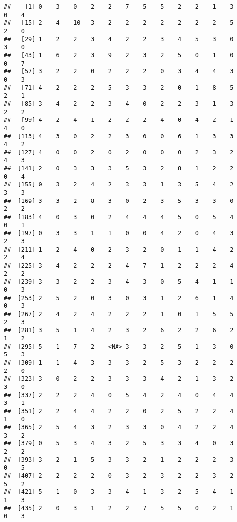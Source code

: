 \documentclass[
]{article}
\begin{document}
\begin{verbatim}
##    [1] 0    3    0    2    2    7    5    5    2    2    1    3    0    4   
##   [15] 2    4    10   3    2    2    2    2    2    2    2    5    2    0   
##   [29] 1    2    2    3    4    2    2    3    4    5    3    0    3    0   
##   [43] 1    6    2    3    9    2    3    2    5    0    1    0    0    7   
##   [57] 3    2    2    0    2    2    2    0    3    4    4    3    0    3   
##   [71] 4    2    2    2    5    3    3    2    0    1    8    5    2    1   
##   [85] 3    4    2    2    3    4    0    2    2    3    1    3    2    2   
##   [99] 4    2    4    1    2    2    2    4    0    4    2    1    4    0   
##  [113] 4    3    0    2    2    3    0    0    6    1    3    3    4    2   
##  [127] 4    0    0    2    0    2    0    0    0    2    3    2    4    3   
##  [141] 2    0    3    3    3    5    3    2    8    1    2    2    0    4   
##  [155] 0    3    2    4    2    3    3    1    3    5    4    2    3    3   
##  [169] 3    3    2    8    3    0    2    3    5    3    3    0    2    2   
##  [183] 4    0    3    0    2    4    4    4    5    0    5    4    0    1   
##  [197] 0    3    3    1    1    0    0    4    2    0    4    3    2    3   
##  [211] 1    2    4    0    2    3    2    0    1    1    4    2    2    4   
##  [225] 3    4    2    2    2    4    7    1    2    2    2    4    2    2   
##  [239] 3    3    2    2    3    4    3    0    5    4    1    1    0    3   
##  [253] 2    5    2    0    3    0    3    1    2    6    1    4    0    3   
##  [267] 2    4    2    4    2    2    2    1    0    1    5    5    2    3   
##  [281] 3    5    1    4    2    3    2    6    2    2    6    2    1    2   
##  [295] 5    1    7    2    <NA> 3    3    2    5    1    3    0    5    3   
##  [309] 1    1    4    3    3    3    2    5    3    2    2    2    2    0   
##  [323] 3    0    2    2    3    3    3    4    2    1    3    2    3    0   
##  [337] 2    2    2    4    0    5    4    2    4    0    4    4    3    1   
##  [351] 2    2    4    4    2    2    0    2    5    2    2    4    1    0   
##  [365] 2    5    4    3    2    3    3    0    4    2    2    4    3    2   
##  [379] 0    5    3    4    3    2    5    3    3    4    0    3    2    2   
##  [393] 3    2    1    5    3    3    2    1    2    2    2    3    0    5   
##  [407] 2    2    2    2    0    3    2    3    2    2    3    2    5    2   
##  [421] 5    1    0    3    3    4    1    3    2    5    4    1    1    3   
##  [435] 2    0    3    1    2    2    7    5    5    0    2    1    0    3   

\end{verbatim}
\end{document}
